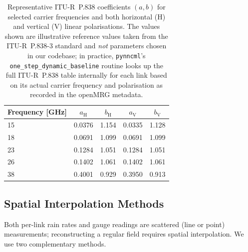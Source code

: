 \documentclass[12pt, a4paper]{article}
\begin{document}
\begin{table}[h]
\centering
\caption{Representative ITU-R~P.838 coefficients $(a, b)$ for selected
carrier frequencies and both horizontal (H) and vertical (V) linear
polarisations. The values shown are illustrative reference values taken
from the ITU-R~P.838-3 standard \cite{ituR838} and \emph{not} parameters
chosen in our codebase; in practice, \texttt{pynncml}'s
\texttt{one\_step\_dynamic\_baseline} routine looks up the full
ITU-R~P.838 table internally for each link based on its actual carrier
frequency and polarisation as recorded in the openMRG metadata.}
\label{tab:itu_coeff}
\begin{tabular}{lcccc}
\toprule
Frequency [GHz] & $a_{\mathrm H}$ & $b_{\mathrm H}$ & $a_{\mathrm V}$ & $b_{\mathrm V}$ \\
\midrule
15 & 0.0376 & 1.154 & 0.0335 & 1.128 \\
18 & 0.0691 & 1.099 & 0.0691 & 1.099 \\
23 & 0.1284 & 1.051 & 0.1284 & 1.051 \\
26 & 0.1402 & 1.061 & 0.1402 & 1.061 \\
38 & 0.4001 & 0.929 & 0.3950 & 0.913 \\
\bottomrule
\end{tabular}
\end{table}

\subsection{Spatial Interpolation Methods}\label{sec:interp}

Both per-link rain rates and gauge readings are scattered (line or
point) measurements; reconstructing a regular field requires spatial
interpolation. We use two complementary methods.
\end{document}
